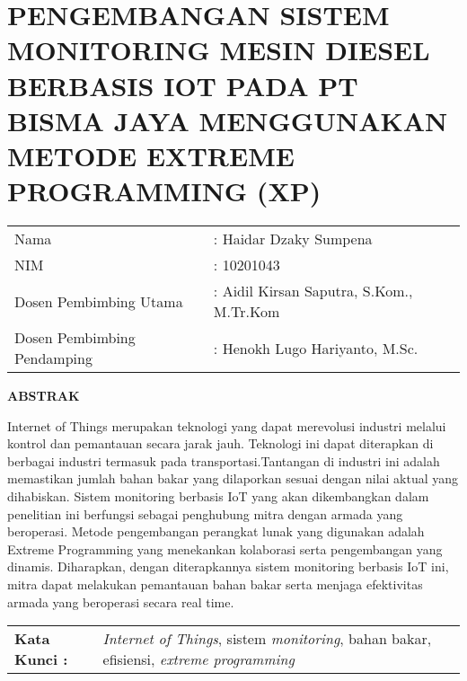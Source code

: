 \chapter*{PENGEMBANGAN SISTEM MONITORING MESIN DIESEL BERBASIS IOT PADA PT BISMA JAYA MENGGUNAKAN METODE EXTREME PROGRAMMING (XP)}
\begin{table}[h]
    \begin{tabular}
        {
            p{}
            p{}
            }
            \\
            Nama & : Haidar Dzaky Sumpena
            \\
            NIM & : 10201043
            \\
            Dosen Pembimbing Utama &
            : Aidil Kirsan Saputra, S.Kom., M.Tr.Kom
            \\
            Dosen Pembimbing Pendamping &
            : Henokh Lugo Hariyanto, M.Sc.
        \end{tabular}
    \end{table}

\begin{center}
    \textbf{ABSTRAK}
\end{center}

Internet of Things merupakan teknologi yang dapat merevolusi industri melalui kontrol dan pemantauan secara jarak jauh. Teknologi ini dapat diterapkan di berbagai industri termasuk pada transportasi.Tantangan di industri ini adalah memastikan jumlah bahan bakar yang dilaporkan sesuai dengan nilai aktual yang dihabiskan. Sistem monitoring berbasis IoT yang akan dikembangkan dalam penelitian ini berfungsi sebagai penghubung mitra dengan armada yang beroperasi. Metode pengembangan perangkat lunak yang digunakan adalah Extreme Programming yang menekankan kolaborasi serta pengembangan yang dinamis. Diharapkan, dengan diterapkannya sistem monitoring berbasis IoT ini, mitra dapat melakukan pemantauan bahan bakar serta menjaga efektivitas armada yang beroperasi secara real time.


\begin{table}[h]
    \begin{tabular}{ p{} p{} }
        \\
        \textbf{Kata Kunci :} & \textit{Internet of Things}, sistem \textit{monitoring}, bahan bakar, efisiensi, \textit{extreme programming}
    \end{tabular}
\end{table}
